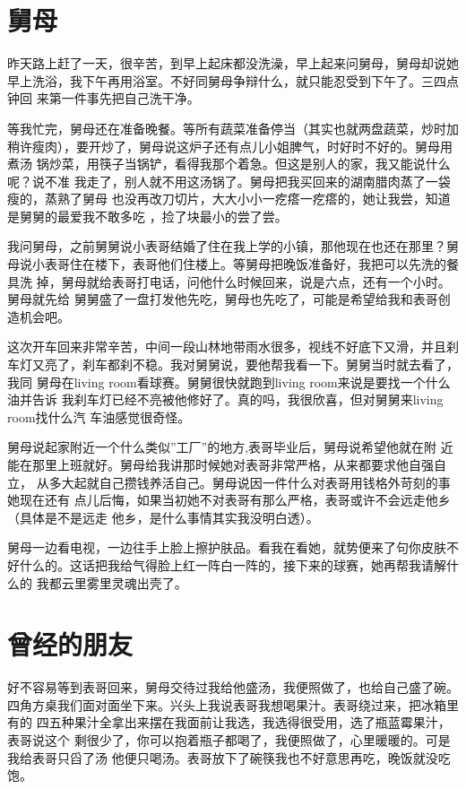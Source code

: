 \documentclass[12pt]{book}
\begin{document}
\section{舅母}
\label{sec-7-5}

        昨天路上赶了一天，很辛苦，到早上起床都没洗澡，早上起来问舅母，舅母却说她
早上洗浴，我下午再用浴室。不好同舅母争辩什么，就只能忍受到下午了。三四点钟回
来第一件事先把自己洗干净。

        等我忙完，舅母还在准备晚餐。等所有蔬菜准备停当（其实也就两盘蔬菜，炒时加
稍许瘦肉），要开炒了，舅母说这炉子还有点儿小姐脾气，时好时不好的。舅母用煮汤
锅炒菜，用筷子当锅铲，看得我那个着急。但这是别人的家，我又能说什么呢？说不准
我走了，别人就不用这汤锅了。舅母把我买回来的湖南腊肉蒸了一袋瘦的，蒸熟了舅母
也没再改刀切片，大大小小一疙瘩一疙瘩的，她让我尝，知道是舅舅的最爱我不敢多吃
，捡了块最小的尝了尝。

        我问舅母，之前舅舅说小表哥结婚了住在我上学的小镇，那他现在也还在那里？舅
母说小表哥住在楼下，表哥他们住楼上。等舅母把晚饭准备好，我把可以先洗的餐具洗
掉，舅母就给表哥打电话，问他什么时候回来，说是六点，还有一个小时。舅母就先给
舅舅盛了一盘打发他先吃，舅母也先吃了，可能是希望给我和表哥创造机会吧。

        这次开车回来非常辛苦，中间一段山林地带雨水很多，视线不好底下又滑，并且刹
车灯又亮了，刹车都刹不稳。我对舅舅说，要他帮我看一下。舅舅当时就去看了，我同
舅母在living room看球赛。舅舅很快就跑到living room来说是要找一个什么油并告诉
我刹车灯已经不亮被他修好了。真的吗，我很欣喜，但对舅舅来living room找什么汽
车油感觉很奇怪。

        舅母说起家附近一个什么类似”工厂”的地方,表哥毕业后，舅母说希望他就在附
近能在那里上班就好。舅母给我讲那时候她对表哥非常严格，从来都要求他自强自立，
从多大起就自己攒钱养活自己。舅母说因一件什么对表哥用钱格外苛刻的事她现在还有
点儿后悔，如果当初她不对表哥有那么严格，表哥或许不会远走他乡（具体是不是远走
他乡，是什么事情其实我没明白透）。

        舅母一边看电视，一边往手上脸上擦护肤品。看我在看她，就势便来了句你皮肤不
好什么的。这话把我给气得脸上红一阵白一阵的，接下来的球赛，她再帮我请解什么的
我都云里雾里灵魂出壳了。
\section{曾经的朋友}
\label{sec-7-6}

        好不容易等到表哥回来，舅母交待过我给他盛汤，我便照做了，也给自己盛了碗。
四角方桌我们面对面坐下来。兴头上我说表哥我想喝果汁。表哥绕过来，把冰箱里有的
四五种果汁全拿出来摆在我面前让我选，我选得很受用，选了瓶蓝霉果汁，表哥说这个
剩很少了，你可以抱着瓶子都喝了，我便照做了，心里暖暖的。可是我给表哥只舀了汤
他便只喝汤。表哥放下了碗筷我也不好意思再吃，晚饭就没吃饱。
\end{document}
